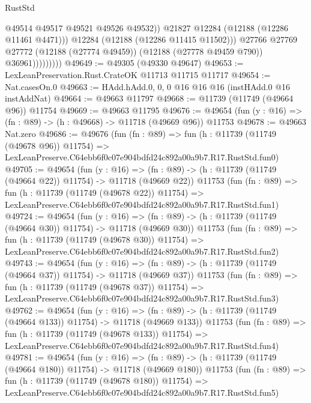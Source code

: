 \begin{lexlean}{RustStd}
\begin{coremodule}
                              @49514
                              @49517
                              @49521
                              @49526
                              @49532))
                          @21827
                          @12284
                          (@12188 (@12286 @11461 @4471)))
                        @12284
                        (@12188 (@12286 @11415 @11502)))
                      @27766
                      @27769
                      @27772
                      (@12188 (@27774 @49459))
                      (@12188 (@27778 @49459 @790))
                      @36961)))))))))
@49649 := @49305 (@49330 @49647)
@49653 := LexLeanPreservation.Rust.CrateOK @11713 @11715 @11717
@49654 := Nat.casesOn.{0}
@49663 := HAdd.hAdd.{0, 0, 0} @16 @16 @16 (instHAdd.{0} @16 instAddNat)
@49664 := @49663 @11797
@49668 := @11739 (@11749 (@49664 @96)) @11754
@49669 := @49663 @11795
@49676 := @49654 (fun (y : @16) => (fn : @89) -> (h : @49668) -> @11718 (@49669 @96)) @11753
@49678 := @49663 Nat.zero
@49686 := @49676
    (fun (fn : @89) =>
    fun (h : @11739 (@11749 (@49678 @96)) @11754) =>
    LexLeanPreserve.C64ebb6f0c07e904bdfd24c892a00a9b7.R17.RustStd.fun0)
@49705 := @49654
    (fun (y : @16) =>
    (fn : @89) -> (h : @11739 (@11749 (@49664 @22)) @11754) -> @11718 (@49669 @22))
    @11753
    (fun (fn : @89) =>
    fun (h : @11739 (@11749 (@49678 @22)) @11754) =>
    LexLeanPreserve.C64ebb6f0c07e904bdfd24c892a00a9b7.R17.RustStd.fun1)
@49724 := @49654
    (fun (y : @16) =>
    (fn : @89) -> (h : @11739 (@11749 (@49664 @30)) @11754) -> @11718 (@49669 @30))
    @11753
    (fun (fn : @89) =>
    fun (h : @11739 (@11749 (@49678 @30)) @11754) =>
    LexLeanPreserve.C64ebb6f0c07e904bdfd24c892a00a9b7.R17.RustStd.fun2)
@49743 := @49654
    (fun (y : @16) =>
    (fn : @89) -> (h : @11739 (@11749 (@49664 @37)) @11754) -> @11718 (@49669 @37))
    @11753
    (fun (fn : @89) =>
    fun (h : @11739 (@11749 (@49678 @37)) @11754) =>
    LexLeanPreserve.C64ebb6f0c07e904bdfd24c892a00a9b7.R17.RustStd.fun3)
@49762 := @49654
    (fun (y : @16) =>
    (fn : @89) -> (h : @11739 (@11749 (@49664 @133)) @11754) -> @11718 (@49669 @133))
    @11753
    (fun (fn : @89) =>
    fun (h : @11739 (@11749 (@49678 @133)) @11754) =>
    LexLeanPreserve.C64ebb6f0c07e904bdfd24c892a00a9b7.R17.RustStd.fun4)
@49781 := @49654
    (fun (y : @16) =>
    (fn : @89) -> (h : @11739 (@11749 (@49664 @180)) @11754) -> @11718 (@49669 @180))
    @11753
    (fun (fn : @89) =>
    fun (h : @11739 (@11749 (@49678 @180)) @11754) =>
    LexLeanPreserve.C64ebb6f0c07e904bdfd24c892a00a9b7.R17.RustStd.fun5)

\end{coremodule}
\end{lexlean}
